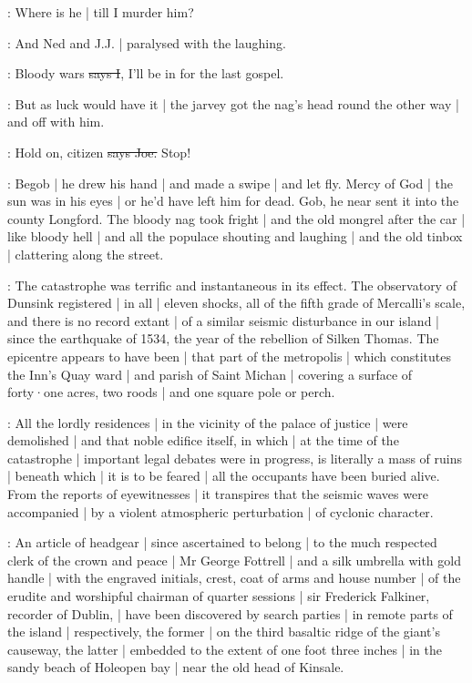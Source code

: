 \citizen:
Where is he |
till I murder him?

\Nq:
And Ned and J.J. |
paralysed with the laughing.

:
Bloody wars
\sout{says I},
I'll be in for the last gospel.

\Nq:
But as luck would have it
 |
the jarvey got the nag's head round the other way |
and off with him.

\joe:
Hold on,
citizen
\sout{says Joe.}
Stop!

\Nq:
Begob |
he drew his hand |
and made a swipe |
and let fly.
Mercy of God |
the sun was in his eyes |
or he'd have left him for dead.
Gob,
he near sent it into the county Longford.
The bloody nag took fright |
and the old mongrel after the car |
like bloody hell |
and all the populace shouting and laughing |
and the old tinbox |
clattering along the street.

:
The catastrophe was terrific and instantaneous in its effect.
The observatory of Dunsink registered |
in all |
eleven shocks,
all of the fifth grade of Mercalli's scale,
and there is no record extant |
of a similar seismic disturbance in our island |
since the earthquake of 1534,
the year of the rebellion of Silken Thomas.
The epicentre appears to have been |
that part of the metropolis |
which constitutes the Inn's Quay ward |
and parish of Saint Michan |
covering a surface of forty·one acres,
two roods |
and one square pole or perch.

:
All the lordly residences |
in the vicinity of the palace of justice |
were demolished |
and that noble edifice itself,
in which |
at the time of the catastrophe |
important legal debates were in progress,
is literally a mass of ruins |
beneath which |
it is to be feared |
all the occupants have been buried alive.
From the reports of eyewitnesses |
it transpires that the seismic waves were accompanied
 |
by a violent atmospheric perturbation |
of cyclonic character.

:
An article of headgear |
since ascertained to belong |
to the much respected clerk of the crown and peace |
Mr George Fottrell |
and a silk umbrella with gold handle |
with the engraved initials,
crest,
coat of arms
and house number |
of the erudite and worshipful chairman of quarter sessions |
sir Frederick Falkiner,
recorder of Dublin, |
have been discovered by search parties |
in remote parts of the island |
respectively,
the former |
on the third basaltic ridge of the giant's causeway,
the latter |
embedded to the extent of one foot three inches |
in the sandy beach of Holeopen bay |
near the old head of Kinsale.

